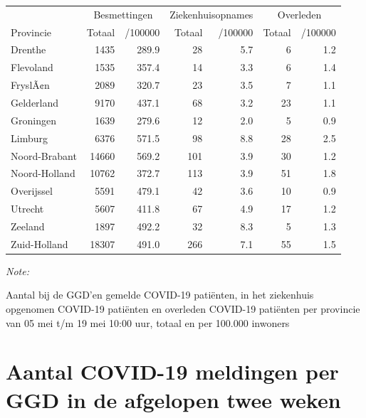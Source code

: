 \documentclass[
  english,
  man,floatsintext]{apa6}
\begin{document}
\begin{table}
\centering
\begin{threeparttable}
\begin{tabular}{lrrrrrr}
\toprule
\multicolumn{1}{c}{ } & \multicolumn{2}{c}{Besmettingen} & \multicolumn{2}{c}{Ziekenhuisopnames} & \multicolumn{2}{c}{Overleden} \\
\cmidrule(l{3pt}r{3pt}){2-3} \cmidrule(l{3pt}r{3pt}){4-5} \cmidrule(l{3pt}r{3pt}){6-7}
Provincie & Totaal & /100000 & Totaal & /100000 & Totaal & /100000\\
\midrule
Drenthe & 1435 & 289.9 & 28 & 5.7 & 6 & 1.2\\
Flevoland & 1535 & 357.4 & 14 & 3.3 & 6 & 1.4\\
FryslÃ¢n & 2089 & 320.7 & 23 & 3.5 & 7 & 1.1\\
Gelderland & 9170 & 437.1 & 68 & 3.2 & 23 & 1.1\\
Groningen & 1639 & 279.6 & 12 & 2.0 & 5 & 0.9\\
Limburg & 6376 & 571.5 & 98 & 8.8 & 28 & 2.5\\
Noord-Brabant & 14660 & 569.2 & 101 & 3.9 & 30 & 1.2\\
Noord-Holland & 10762 & 372.7 & 113 & 3.9 & 51 & 1.8\\
Overijssel & 5591 & 479.1 & 42 & 3.6 & 10 & 0.9\\
Utrecht & 5607 & 411.8 & 67 & 4.9 & 17 & 1.2\\
Zeeland & 1897 & 492.2 & 32 & 8.3 & 5 & 1.3\\
Zuid-Holland & 18307 & 491.0 & 266 & 7.1 & 55 & 1.5\\
\bottomrule
\end{tabular}
\begin{tablenotes}
\item \textit{Note: } 
\item Aantal bij de GGD’en gemelde COVID-19 patiënten, in het ziekenhuis opgenomen COVID-19 patiënten en overleden COVID-19 patiënten per provincie van 05 mei t/m 19 mei 10:00 uur, totaal en per 100.000 inwoners
\end{tablenotes}
\end{threeparttable}
\end{table}

\newpage

\hypertarget{aantal-covid-19-meldingen-per-ggd-in-de-afgelopen-twee-weken}{%
\section{Aantal COVID-19 meldingen per GGD in de afgelopen twee weken}\label{aantal-covid-19-meldingen-per-ggd-in-de-afgelopen-twee-weken}}
\end{document}
